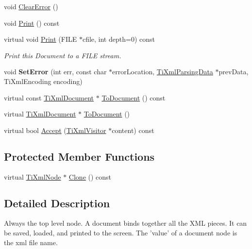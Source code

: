\begin{DoxyCompactItemize}
\item 
void \hyperlink{class_ti_xml_document_ac66b8c28db86363315712a3574e87c35}{\-Clear\-Error} ()
\item 
void \hyperlink{class_ti_xml_document_af08389ec70ee9b2de7f800e206a18510}{\-Print} () const 
\item 
\hypertarget{class_ti_xml_document_a7b1aea204fee266b70b9c105c8bf2ada}{
virtual void \hyperlink{class_ti_xml_document_a7b1aea204fee266b70b9c105c8bf2ada}{\-Print} (\-F\-I\-L\-E $\ast$cfile, int depth=0) const }
\label{class_ti_xml_document_a7b1aea204fee266b70b9c105c8bf2ada}

\begin{DoxyCompactList}\small\item\em \-Print this \-Document to a \-F\-I\-L\-E stream. \end{DoxyCompactList}\item 
\hypertarget{class_ti_xml_document_a735c23e318597b920c94eae77fa206de}{
void {\bfseries \-Set\-Error} (int err, const char $\ast$error\-Location, \hyperlink{class_ti_xml_parsing_data}{\-Ti\-Xml\-Parsing\-Data} $\ast$prev\-Data, \-Ti\-Xml\-Encoding encoding)}
\label{class_ti_xml_document_a735c23e318597b920c94eae77fa206de}

\item 
virtual const \hyperlink{class_ti_xml_document}{\-Ti\-Xml\-Document} $\ast$ \hyperlink{class_ti_xml_document_a1dc977bde3e4fe85a8eb9d88a35ef5a4}{\-To\-Document} () const 
\item 
virtual \hyperlink{class_ti_xml_document}{\-Ti\-Xml\-Document} $\ast$ \hyperlink{class_ti_xml_document_a1025d942a1f328fd742d545e37efdd42}{\-To\-Document} ()
\item 
virtual bool \hyperlink{class_ti_xml_document_a3daab2f472418ef66315750202f762ae}{\-Accept} (\hyperlink{class_ti_xml_visitor}{\-Ti\-Xml\-Visitor} $\ast$content) const 
\end{DoxyCompactItemize}
\subsection*{\-Protected \-Member \-Functions}
\begin{DoxyCompactItemize}
\item 
virtual \hyperlink{class_ti_xml_node}{\-Ti\-Xml\-Node} $\ast$ \hyperlink{class_ti_xml_document_ac9e8f09b23454d953b32d1b65cd1409e}{\-Clone} () const 
\end{DoxyCompactItemize}


\subsection{\-Detailed \-Description}
\-Always the top level node. \-A document binds together all the \-X\-M\-L pieces. \-It can be saved, loaded, and printed to the screen. \-The 'value' of a document node is the xml file name. 

